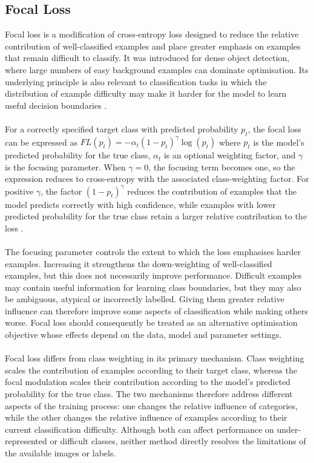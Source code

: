 \documentclass[12pt, a4paper]{report}
\let\oldsubsection\subsection
\renewcommand{\subsection}{%
    \Needspace{6\baselineskip}%
    \oldsubsection
}
\begin{document}
			\subsection{Focal Loss}
				
				Focal loss is a modification of cross-entropy loss designed to reduce the relative contribution of well-classified examples and place greater emphasis on examples that remain difficult to classify. It was introduced for dense object detection, where large numbers of easy background examples can dominate optimisation. Its underlying principle is also relevant to classification tasks in which the distribution of example difficulty may make it harder for the model to learn useful decision boundaries \cite{lin2017focal}.\\\\
				For a correctly specified target class with predicted probability $p_{t}$, the focal loss can be expressed as $FL\left(p_{t}\right)=-\alpha_{t}\left(1-p_{t}\right)^{\gamma}\log\left(p_{t}\right)$ where $p_{t}$ is the model's predicted probability for the true class, $\alpha_{t}$ is an optional weighting factor, and $\gamma$ is the focusing parameter. When $\gamma=0$, the focusing term becomes one, so the expression reduces to cross-entropy with the associated class-weighting factor. For positive $\gamma$, the factor $\left(1-p_{t}\right)^{\gamma}$ reduces the contribution of examples that the model predicts correctly with high confidence, while examples with lower predicted probability for the true class retain a larger relative contribution to the loss \cite{lin2017focal}.\\\\
				The focusing parameter controls the extent to which the loss emphasises harder examples. Increasing it strengthens the down-weighting of well-classified examples, but this does not necessarily improve performance. Difficult examples may contain useful information for learning class boundaries, but they may also be ambiguous, atypical or incorrectly labelled. Giving them greater relative influence can therefore improve some aspects of classification while making others worse. Focal loss should consequently be treated as an alternative optimisation objective whose effects depend on the data, model and parameter settings.\\\\
				Focal loss differs from class weighting in its primary mechanism. Class weighting scales the contribution of examples according to their target class, whereas the focal modulation scales their contribution according to the model's predicted probability for the true class. The two mechanisms therefore address different aspects of the training process: one changes the relative influence of categories, while the other changes the relative influence of examples according to their current classification difficulty. Although both can affect performance on under-represented or difficult classes, neither method directly resolves the limitations of the available images or labels.\\\\\\\\\\
\end{document}
